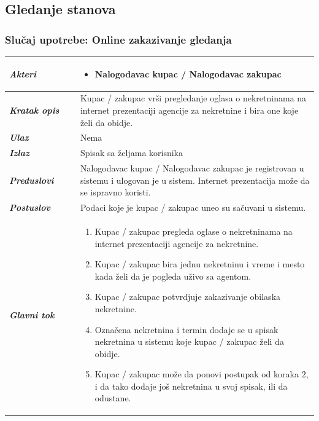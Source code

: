 \documentclass[20pt]{article}
\begin{document}
\newpage
\subsection{\bfseries \Large Gledanje stanova}
\setlength{\parindent}{1cm}
\fontsize{13}{18} \selectfont 
\subsubsection{\bfseries \large Slu\v{c}aj upotrebe: Online zakazivanje gledanja}
\begin{center}
\begin{longtable}{p{0.23\linewidth} p{0.77\linewidth}}
 \hline
 {\it \bfseries Akteri} & \begin{itemize}
    \item Nalogodavac kupac / Nalogodavac zakupac
\end{itemize}\\
\hline

 {\it \bfseries Kratak opis} & Kupac / zakupac vr\v si pregledanje oglasa o nekretninama na internet prezentaciji agencije za nekretnine i bira one koje \v zeli da obidje.\\ 
 \hline
 
 {\it \bfseries Ulaz} & Nema\\ 
 \hline
 
 {\it \bfseries Izlaz} & Spisak sa \v zeljama korisnika\\
 \hline
 
 {\it \bfseries Preduslovi} & Nalogodavac kupac / Nalogodavac zakupac je registrovan u sistemu i ulogovan je u sistem. Internet prezentacija mo\v ze da se ispravno koristi.\\
 \hline

 {\it \bfseries Postuslov} & Podaci koje je kupac / zakupac uneo su sa\v cuvani u sistemu.\\
 \hline

     {\it \bfseries Glavni tok} &  
     \begin{enumerate}
         \item  Kupac / zakupac pregleda oglase o nekretninama na internet prezentaciji agencije za nekretnine.
         \item  Kupac / zakupac bira jednu nekretninu i vreme i mesto kada \v zeli da je pogleda u\v zivo sa agentom.
         \item  Kupac / zakupac potvrdjuje zakazivanje obilaska nekretnine.
         \item  Označena nekretnina i termin dodaje se u spisak nekretnina u sistemu koje kupac / zakupac želi da obidje.
         \item  Kupac / zakupac mo\v ze da ponovi postupak od koraka $2$, i da tako dodaje jo\v s nekretnina u svoj spisak, ili da odustane.
    \end{enumerate}\\
 \hline


\end{longtable}
\end{center}
\end{document}
